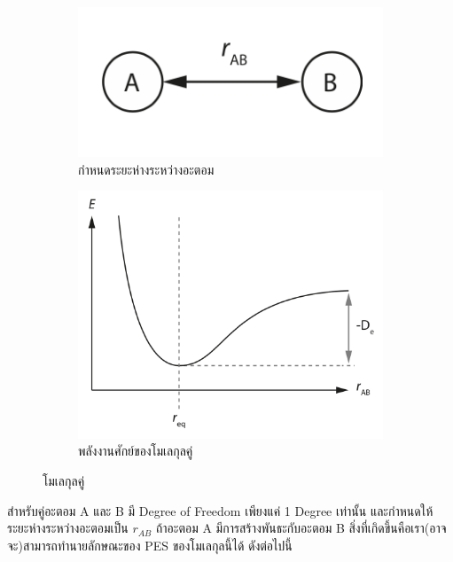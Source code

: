 \begin{figure}[htbp]
    \centering
    \begin{subfigure}{0.5\textwidth}
        \centering
        \includegraphics[width=0.9\linewidth]{fig/diatomic_molecule.png}
        \caption{กำหนดระยะห่างระหว่างอะตอม}
        \label{fig:diatomic_mol}
    \end{subfigure}%
    \begin{subfigure}{0.5\textwidth}
        \centering
        \includegraphics[width=0.9\linewidth]{fig/PES_diatomic_mol.png}
        \caption{พลังงานศักย์ของโมเลกุลคู่}
        \label{fig:PES_diatomic}
    \end{subfigure}
    \caption{โมเลกุลคู่}
    \label{fig:diatomic_mol_and_PES}
\end{figure}

สำหรับคู่อะตอม A และ B มี Degree of Freedom เพียงแค่ 1 Degree เท่านั้น และกำหนดให้ระยะห่างระหว่างอะตอมเป็น $r_{AB}$ ถ้าอะตอม 
A มีการสร้างพันธะกับอะตอม B สิ่งที่เกิดขึ้นคือเรา(อาจจะ)สามารถทำนายลักษณะของ PES ของโมเลกุลนี้ได้ ดังต่อไปนี้

